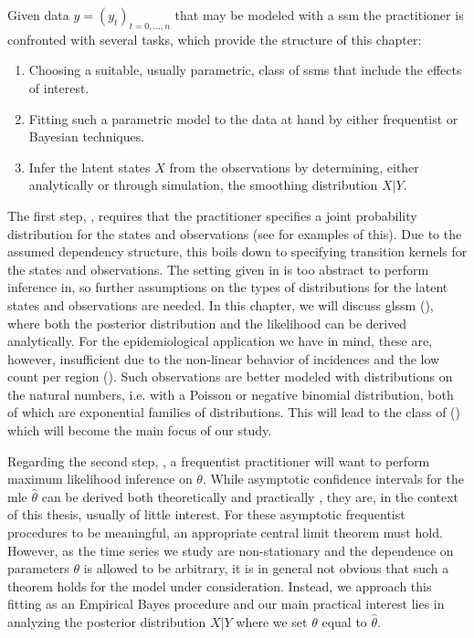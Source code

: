 Given data $y = (y_t)_{t = 0, \dots, n}$ that may be modeled with a \gls{ssm} the practitioner is confronted with several tasks, which provide the structure of this chapter:

\begin{enumerate}
    \item\label{it:model_choice} Choosing a suitable, usually parametric, class of \glspl{ssm} that include the effects of interest.
    \item\label{it:model_fitting} Fitting such a parametric model to the data at hand by either frequentist or Bayesian techniques.
    \item\label{it:smoothing_problem} Infer the latent states $X$ from the observations by determining, either analytically or through simulation, the smoothing distribution $X|Y$.
\end{enumerate}

The first step, , requires that the practitioner specifies a joint probability distribution for the states and observations (see  for examples of this).
Due to the assumed dependency structure, this boils down to specifying transition kernels for the states and observations.
The setting given in  is too abstract to perform inference in, so further assumptions on the types of distributions for the latent states and observations are needed.
In this chapter, we will discuss \gls{glssm}  (), where both the posterior distribution and the likelihood can be derived analytically. For the epidemiological application we have in mind, these are, however, insufficient due to the non-linear behavior of incidences and the low count per region ().
Such observations are better modeled with distributions on the natural numbers, i.e. with a Poisson or negative binomial distribution, both of which are exponential families of distributions. This will lead to the class of  () which will become the main focus of our study.

Regarding the second step, , a frequentist practitioner will want to perform maximum likelihood inference on $\theta$.
While asymptotic confidence intervals for the \gls{mle} $\hat\theta$ can be derived both theoretically and practically \citep[Chapter 7]{Durbin2012Time}, they are, in the context of this thesis, usually of little interest. For these asymptotic frequentist procedures to be meaningful, an appropriate central limit theorem must hold. However, as the time series we study are non-stationary and the dependence on parameters $\theta$ is allowed to be arbitrary, it is in general not obvious that such a theorem holds for the model under consideration. Instead, we approach this fitting as an Empirical Bayes procedure and our main practical interest lies in analyzing the posterior distribution $X|Y$ where we set $\theta$ equal to $\hat\theta$. 


